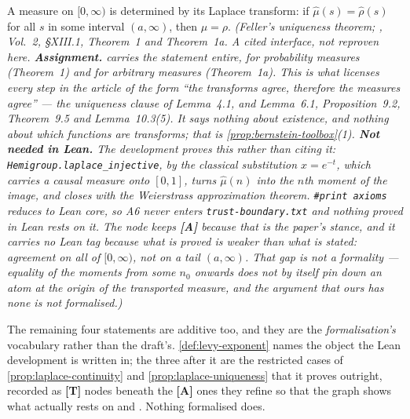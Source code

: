\begin{proposition}\label{prop:laplace-uniqueness}
A measure on $[0,\infty)$ is determined by its Laplace transform: if $\hat\mu(s) = \hat\rho(s)$
for all $s$ in some interval $(a,\infty)$, then $\mu = \rho$.
\statusA\quad{}\quad\emph{(Feller's uniqueness theorem;
, Vol.~2, \S XIII.1, Theorem~1 and Theorem~1a. A cited
interface, not reproven here. \textbf{Assignment.}  carries the statement entire,
for probability measures (Theorem~1) and for arbitrary measures (Theorem~1a). This is what
licenses every step in the article of the form ``the transforms agree, therefore the measures
agree'' --- the uniqueness clause of Lemma~4.1, and Lemma~6.1, Proposition~9.2, Theorem~9.5
and Lemma~10.3(5). It says nothing about existence, and nothing about which functions are
transforms; that is \ref{prop:bernstein-toolbox}(1). \textbf{Not needed in Lean.} The
development proves this rather than citing it: \texttt{Hemigroup.laplace\_injective}, by the
classical substitution $x = e^{-t}$, which carries a causal measure onto $[0,1]$, turns
$\hat\mu(n)$ into the $n$th moment of the image, and closes with the Weierstrass approximation
theorem. \texttt{\#print axioms} reduces to Lean core, so A6 never enters
\texttt{trust-boundary.txt} and nothing proved in Lean rests on it. The node keeps \textbf{[A]}
because that is the \emph{paper's} stance, and it carries no Lean tag because what is proved is
weaker than what is stated: agreement on all of $[0,\infty)$, not on a tail $(a,\infty)$. That
gap is not a formality --- equality of the moments from some $n_0$ onwards does not by itself
pin down an atom at the origin of the transported measure, and the argument that ours has none
is not formalised.)}
\end{proposition}

\bigskip

The remaining four statements are additive too, and they are the \emph{formalisation's}
vocabulary rather than the draft's. \ref{def:levy-exponent} names the object the Lean
development is written in; the three after it are the restricted cases of \ref{prop:laplace-continuity}
and \ref{prop:laplace-uniqueness} that it proves outright, recorded as \textbf{[T]} nodes beneath
the \textbf{[A]} ones they refine so that the graph shows what actually rests on  and
. Nothing formalised does.


